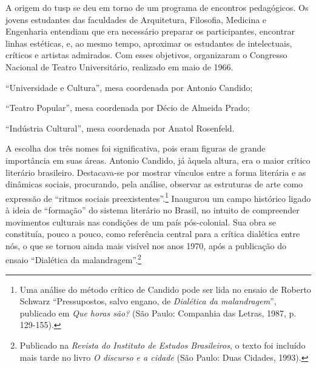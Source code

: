 \subject{Para definir a orientação do grupo e estabelecer parcerias}

A origem do {\sc tusp} se deu em torno de um programa de encontros
pedagógicos. Os jovens estudantes das faculdades de Arquitetura,
Filosofia, Medicina e Engenharia entendiam que era necessário preparar
os participantes, encontrar linhas estéticas, e, ao mesmo tempo, aproximar
os estudantes de intelectuais, críticos e artistas admirados. Com esses
objetivos, organizaram o Congresso Nacional de Teatro
Universitário, realizado em maio de 1966.


\startitemize[n,packed]
\item
  “Universidade e Cultura”, mesa coordenada por Antonio Candido;
\item
  “Teatro Popular”, mesa coordenada por Décio de Almeida Prado;
\item
  “Indústria Cultural”, mesa coordenada por Anatol Rosenfeld.
\stopitemize

A escolha dos três nomes foi significativa, pois eram figuras de
grande importância em suas áreas. Antonio Candido, já àquela altura, era
o maior crítico literário brasileiro. Destacava-se por mostrar vínculos
entre a forma literária e as dinâmicas sociais, procurando, pela
análise, observar as estruturas de arte como expressão de “ritmos
sociais preexistentes”.\footnote{Uma análise do método crítico de Candido
  pode ser lida no ensaio de Roberto Schwarz “Pressupostos, salvo
  engano, de {\it Dialética da malandragem}”, publicado em {\it Que
  horas são?} (São Paulo: Companhia das Letras, 1987, p.\,129-155).}
Inaugurou um campo histórico ligado à ideia de “formação” do sistema
literário no Brasil, no intuito de compreender movimentos culturais nas
condições de um país pós-colonial. Sua obra se constituía, pouco a
pouco, como referência central para a crítica dialética entre nós, o que
se tornou ainda mais visível nos anos 1970, após a publicação do ensaio
“Dialética da malandragem”.\footnote{Publicado na {\it Revista do Instituto de Estudos Brasileiros}, o texto foi incluído mais tarde no livro {\it O
  discurso e a cidade} (São Paulo: Duas Cidades, 1993).}

